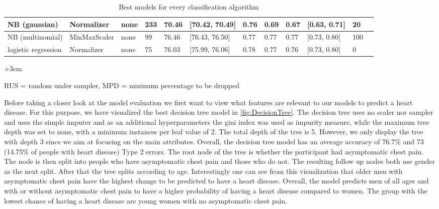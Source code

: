 \begin{table}[]
\begin{adjustwidth}{-3cm}{}
\begin{footnotesize}
\begin{tabular}{|l|l|l|l|l|l|l|l|l|l|l|l|}
NB (gaussian)             & Normalizer           & none               & 233             & 70.46         & {[}70.42, 70.49{]}   & 0.76           & 0.69        & 0.67         & {[}0.63, 0.71{]}     & 20                                                   \\ \hline
NB (multinomial)          & MinMaxScaler         & none               & 99              & 76.46         & {[}76.43, 76.50{]}   & 0.77           & 0.77        & 0.77         & {[}0.73, 0.80{]}     & 100                                                  \\ \hline
logistic regression                & Normalizer           & none               & 75              & 76.03         & {[}75.99, 76.06{]}   & 0.78           & 0.77         & 0.76         & {[}0.73, 0.80{]}     & 0                                                    \\ \hline
\end{tabular}

\begin{adjustwidth}{+3cm}{}
\begin{center}
\centering
RUS = random under sampler, MPD = minimum percentage to be dropped
\end{center}
\end{adjustwidth}
\end{footnotesize}
\caption{Best models for every classification algorithm} 
\label{table:modelresults}
	
\end{adjustwidth}
\end{table}



Before taking a closer look at the model evaluation we first want to view what features are relevant to our models to predict a heart disease. For this purpose, we have visualized the best decision tree model in \cref{fig:DecisionTree}. The decision tree uses no scaler nor sampler and uses the simple imputer and as an additional hyperparameters the gini index was used as impurity measure, while the maximum tree depth was set to none, with a minimum instances per leaf value of 2. The total depth of the tree is 5. However, we only display the tree with depth 3 since we aim at focusing on the main attributes. Overall, the decision tree model has an average accuracy of 76.7\% and 73 (14.75\% of people with heart disease) Type 2 errors. The root node of the tree is whether the participant had asymptomatic chest pain. The node is then split into people who have asymptomatic chest pain and those who do not. The resulting follow up nodes both use gender as the next split. After that the tree splits according to age. Interestingly one can see from this visualization that older men with asymptomatic chest pain have the highest change to be predicted to have a heart disease. Overall, the model predicts men of all ages and with or without asymptomatic chest pain to have a higher probability of having a heart disease compared to women. The group with the lowest chance of having a heart disease are young women with no asymptomatic chest pain. 

